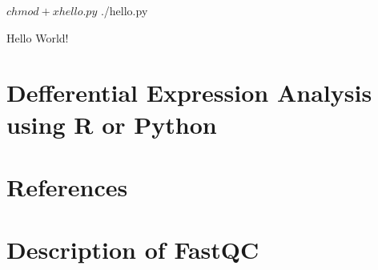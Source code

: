 \documentclass{article}
\begin{document}


\begin{script}
	
		$ chmod +x hello.py
		$ ./hello.py

		Hello World!
	
\end{script}

\section{Defferential Expression Analysis using R or Python}

\section{References}
\printbibliography

\appendix

\section{Description of FastQC}
\end{document}

